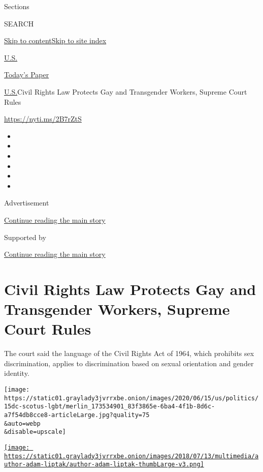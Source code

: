 Sections

SEARCH

\protect\hyperlink{site-content}{Skip to
content}\protect\hyperlink{site-index}{Skip to site index}

\href{https://www.nytimes3xbfgragh.onion/section/us}{U.S.}

\href{https://myaccount.nytimes3xbfgragh.onion/auth/login?response_type=cookie\&client_id=vi}{}

\href{https://www.nytimes3xbfgragh.onion/section/todayspaper}{Today's
Paper}

\href{/section/us}{U.S.}\textbar{}Civil Rights Law Protects Gay and
Transgender Workers, Supreme Court Rules

\url{https://nyti.ms/2B7rZtS}

\begin{itemize}
\item
\item
\item
\item
\item
\item
\end{itemize}

Advertisement

\protect\hyperlink{after-top}{Continue reading the main story}

Supported by

\protect\hyperlink{after-sponsor}{Continue reading the main story}

\hypertarget{civil-rights-law-protects-gay-and-transgender-workers-supreme-court-rules}{%
\section{Civil Rights Law Protects Gay and Transgender Workers, Supreme
Court
Rules}\label{civil-rights-law-protects-gay-and-transgender-workers-supreme-court-rules}}

The court said the language of the Civil Rights Act of 1964, which
prohibits sex discrimination, applies to discrimination based on sexual
orientation and gender identity.

\texttt{[image: https://static01.graylady3jvrrxbe.onion/images/2020/06/15/us/politics/15dc-scotus-lgbt/merlin\_173534901\_83f3865e-6ba4-4f1b-8d6c-a7f54db8cce8-articleLarge.jpg?quality=75\\\&auto=webp\\\&disable=upscale]}

\href{https://www.nytimes3xbfgragh.onion/by/adam-liptak}{\texttt{[image: https://static01.graylady3jvrrxbe.onion/images/2018/07/13/multimedia/author-adam-liptak/author-adam-liptak-thumbLarge-v3.png]}}

